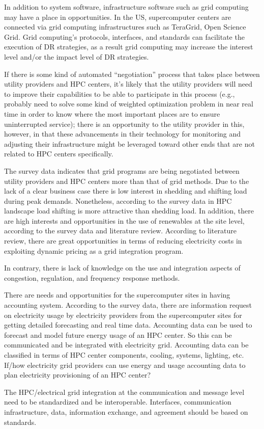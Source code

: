 In addition to system software, infrastructure software such as grid computing may have a place in opportunities. In the US, supercomputer centers are connected via grid computing infrastructures such as TeraGrid, Open Science Grid. Grid computing's protocols, interfaces, and standards can facilitate the execution of DR strategies, as a result grid computing may increase the interest level and/or the impact level of DR strategies.

If there is some kind of automated ``negotiation'' process that takes place between utility providers and HPC centers, it's likely that the utility providers will need to improve their capabilities to be able to participate in this process (e.g., probably need to solve some kind of weighted optimization problem in near real time in order to know where the most important places are to ensure uninterrupted service); there is an opportunity to the utility provider in this, however, in that these advancements in their technology for monitoring and adjusting their infrastructure might be leveraged toward other ends that are not related to HPC centers specifically.


The survey data indicates that grid programs are being negotiated between utility providers and HPC centers more than that of grid methods. Due to the lack of a clear business case there is low interest in shedding and shifting load during peak demands. Nonetheless, according to the survey data in HPC landscape load shifting is more attractive than shedding load. In addition, there are high interests and opportunities in the use of renewables at the site level, according to the survey data and literature review. According to literature review, there are great opportunities in terms of reducing electricity costs in exploiting dynamic pricing as a grid integration program.

In contrary, there is lack of knowledge on the use and integration aspects of congestion, regulation, and frequency response methods. 

There are needs and opportunities for the supercomputer sites in having accounting system. According to the survey data, there are information request on electricity usage by electricity providers from the supercomputer sites for getting detailed forecasting and real time data. Accounting data can be used to forecast and model future energy usage of an HPC center. So this can be communicated and be integrated with electricity grid. Accounting data can be classified in terms of HPC center components, cooling, systems, lighting, etc. If/how electricity grid providers can use energy and usage accounting data to plan electricity provisioning of an HPC center? %

The HPC/electrical grid integration at the communication and message level need to be standardized and be interoperable. Interfaces, communication infrastructure, data, information exchange, and agreement should be based on standards.
